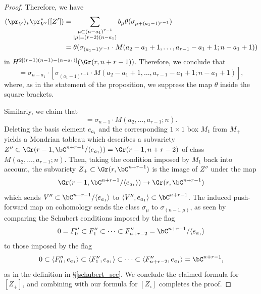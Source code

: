\begin{proof}
Therefore, we have
\begin{align*}
(\pr_V)_{*}\pr_{V'}^{*}([Z'])&=\sum_{\substack{\mu\subset(n-a_1)^{r-1} \\ |\mu|=(r-2)(n-a_1)}} b_\mu\theta(\sigma_{\mu+(a_1-1)^{r-1}})\\
&=\theta(\sigma_{(a_1-1)^{r-1}}\cdot M(a_2-a_1+1,\ldots,a_{r-1}-a_1+1;n-a_1+1))
\end{align*}
in $H^{2[(r-1)(n-1)-(n-a_1)]}(\Gr(r,n+r-1))$. Therefore, we conclude that
\begin{equation*}
[Z_\circ]=\sigma_{n-a_1}\cdot [\sigma_{(a_1-1)^{r-1}}\cdot M(a_2-a_1+1,\ldots,a_{r-1}-a_1+1;n-a_1+1)],
\end{equation*}
where, as in the statement of the proposition, we suppress the map $\theta$ inside the square brackets.

Similarly, we claim that
\begin{equation*}
[Z_+]=\sigma_{n-1}\cdot M(a_2,\ldots,a_{r-1};n).
\end{equation*}
Deleting the basis element $e_{a_1}$ and the corresponding $1\times1$ box $M_1$ from $M_+$ yields a Mondrian tableau which describes a subvariety $Z''\subset\Gr(r-1,\bC^{n+r-1}/\langle e_{a_1}\rangle)=\Gr(r-1,n+r-2)$ of class $M(a_2,\ldots,a_{r-1};n)$. Then, taking the condition imposed by $M_1$ back into account, the subvariety $Z_+\subset\Gr(r,\bC^{n+r-1})$ is the image of $Z''$ under the map
\begin{equation*}
\Gr(r-1,\bC^{n+r-1}/\langle e_{a_1}\rangle)\to\Gr(r,\bC^{n+r-1})
\end{equation*}
which sends $V''\subset \bC^{n+r-1}/\langle e_{a_1}\rangle$ to $\langle V'',e_{a_1}\rangle\subset \bC^{n+r-1}$. The induced push-forward map on cohomology sends the class $\sigma_{\mu}$ to $\sigma_{(n-1,\mu)}$, as seen by comparing the Schubert conditions imposed by the flag 
\begin{equation*}
0= F''_0\subset F''_1\subset\cdots\subset F''_{n+r-2}=\bC^{n+r-1}/\langle e_{a_1}\rangle
\end{equation*}
to those imposed by the flag 
\begin{equation*}
0\subset \langle F''_0,e_{a_1}\rangle\subset \langle F''_1,e_{a_1}\rangle\subset\cdots\subset \langle F''_{n+r-2},e_{a_1}\rangle=\bC^{n+r-1},
\end{equation*}
as in the definition in \S\ref{schubert_sec}. We conclude the claimed formula for $[Z_+]$, and combining with our formula for $[Z_\circ]$ completes the proof.
\end{proof}

